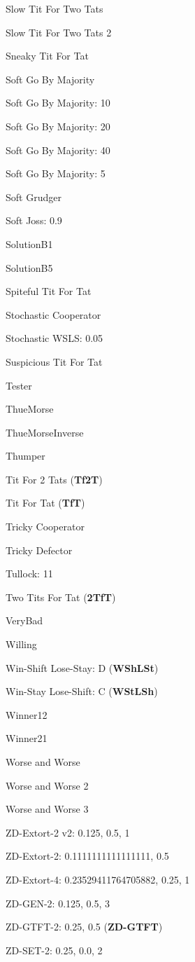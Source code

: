 \item Slow Tit For Two Tats
\item Slow Tit For Two Tats 2
\item Sneaky Tit For Tat
\item Soft Go By Majority
\item Soft Go By Majority: 10
\item Soft Go By Majority: 20
\item Soft Go By Majority: 40
\item Soft Go By Majority: 5
\item Soft Grudger
\item Soft Joss: 0.9
\item SolutionB1
\item SolutionB5
\item Spiteful Tit For Tat
\item Stochastic Cooperator
\item Stochastic WSLS: 0.05
\item Suspicious Tit For Tat
\item Tester
\item ThueMorse
\item ThueMorseInverse
\item Thumper
\item Tit For 2 Tats
(\textbf{Tf2T})\item Tit For Tat
(\textbf{TfT})\item Tricky Cooperator
\item Tricky Defector
\item Tullock: 11
\item Two Tits For Tat
(\textbf{2TfT})\item VeryBad
\item Willing
\item Win-Shift Lose-Stay: D
(\textbf{WShLSt})\item Win-Stay Lose-Shift: C
(\textbf{WStLSh})\item Winner12
\item Winner21
\item Worse and Worse
\item Worse and Worse 2
\item Worse and Worse 3
\item ZD-Extort-2 v2: 0.125, 0.5, 1
\item ZD-Extort-2: 0.1111111111111111, 0.5
\item ZD-Extort-4: 0.23529411764705882, 0.25, 1
\item ZD-GEN-2: 0.125, 0.5, 3
\item ZD-GTFT-2: 0.25, 0.5
(\textbf{ZD-GTFT})\item ZD-SET-2: 0.25, 0.0, 2
